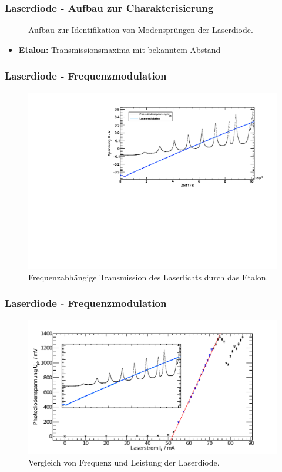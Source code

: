\begin{frame}
\frametitle{Laserdiode - Aufbau zur Charakterisierung}
\begin{figure}
    \centering
    \def\svgwidth{\textwidth}
    
    \caption{Aufbau zur Identifikation von Modensprüngen der Laserdiode.}
\end{figure}
\begin{itemize}
  \item \textbf{Etalon:} Transmissionsmaxima mit bekanntem Abstand
\end{itemize}
\end{frame}


\begin{frame}
\frametitle{Laserdiode - Frequenzmodulation}
\begin{figure}[H]
    \begin{center}
        \includegraphics[width=\textwidth]{../img/up-etalon_zoom.pdf}
        \caption{Frequenzabhängige Transmission des Laserlichts durch das Etalon.}
    \end{center}
\end{figure}
\end{frame}


\begin{frame}
\frametitle{Laserdiode - Frequenzmodulation}

\begin{figure}[H]
    \begin{center}
        \includegraphics[width=\textwidth]{../img/diodenkennlinie+etalonspect.pdf}
        \caption{Vergleich von Frequenz und Leistung der Laserdiode.}
    \end{center}
\end{figure}
\end{frame}



